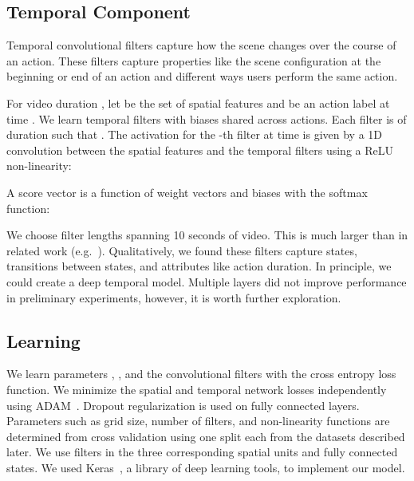 \documentclass[runningheads]{llncs}
\begin{document}
\subsection{Temporal Component}

Temporal convolutional filters capture how the scene changes over the course of an action. These filters capture properties like the scene configuration at the beginning or end of an action and different ways users perform the same action. 

For video duration , let  be the set of spatial features and  be an action label at time .
We learn  temporal filters  with biases  shared across actions. 
Each filter is of duration  such that .
The activation for the -th filter at time  is given by a 1D convolution between the spatial features  and the temporal filters using a ReLU non-linearity:


A score vector  is a function of weight vectors  and biases  with the softmax function:



We choose filter lengths spanning 10 seconds of video. This is much larger than in related work (e.g.~\cite{sun_iccv_2015,ng_cvpr_2015}). Qualitatively, we found these filters capture states, transitions between states, and attributes like action duration. 
In principle, we could create a deep temporal model. Multiple layers did not improve performance in preliminary experiments, however, it is worth further exploration.








\subsection{Learning}
We learn parameters , , and the convolutional filters with the cross entropy loss function.
We minimize the spatial and temporal network losses independently
using ADAM~\cite{ADAM}. 
Dropout regularization is used on fully connected layers.
Parameters such as grid size, number of filters, and non-linearity functions are determined from cross validation using one split each from the datasets described later. We use  filters in the three corresponding spatial units and  fully connected states.
We used Keras~\cite{keras}, a library of deep learning tools, to implement our model. 






%
 
\end{document}
